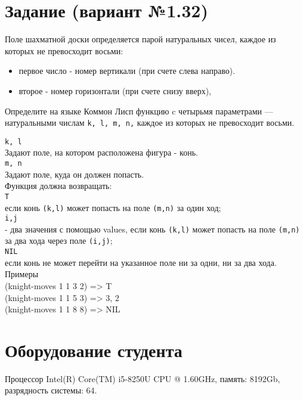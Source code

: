 \documentclass[12pt]{article}
\begin{document}
\section{Задание (вариант №1.32)}
{\large 
Поле шахматной доски определяется парой натуральных чисел, каждое из которых не превосходит восьми:
\begin{itemize} 
	\item первое число - номер вертикали (при счете слева направо).
	\item второе - номер горизонтали (при счете снизу вверх),
\end{itemize}
Определите на языке Коммон Лисп функцию c четырьмя параметрами --- натуральными 
числам {\tt k, l, m, n,} каждое из которых не превосходит восьми.


{\tt k, l} \\
	Задают поле, на котором расположена фигура - конь. \\

{\tt m, n} \\
	    Задают поле, куда он должен попасть. \\

Функция должна возвращать: \\

{\tt T} \\
	если конь {\tt (k,l)} может попасть на поле {\tt (m,n)} за один ход; \\

{\tt i,j} \\
    - два значения с помощью values, если конь {\tt (k,l)} может попасть на 
	поле {\tt(m,n)} за два хода через поле {\tt (i,j)}; \\

{\tt NIL} \\
    если конь не может перейти на указанное поле ни за одни, ни за два хода. \\

Примеры \\
(knight-moves 1 1 3 2) => T \\
(knight-moves 1 1 5 3) => 3, 2 \\
(knight-moves 1 1 8 8) => NIL \\
}

\section{Оборудование студента}
{\large Процессор Intel(R) Core(TM) i5-8250U CPU @ 1.60GHz, память: 8192Gb, разрядность системы: 64.}
\end{document}
